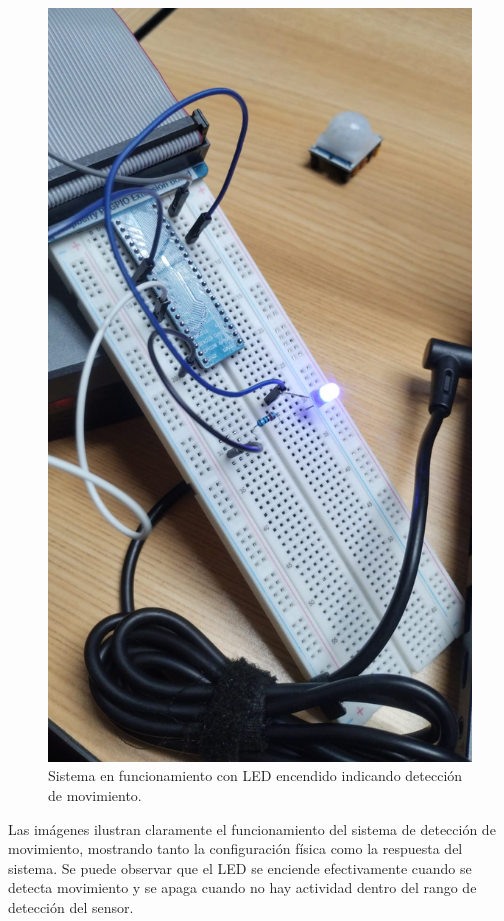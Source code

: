 \begin{figure}[h]
	\centering
	\includegraphics[width=0.5\textheight]{imagenes/4.jpg}
	\caption{Sistema en funcionamiento con LED encendido indicando detección de movimiento.}
	\label{fig:detenccionON}
\end{figure}

Las imágenes ilustran claramente el funcionamiento del sistema de detección de movimiento, mostrando tanto la configuración física como la respuesta del sistema. Se puede observar que el LED se enciende efectivamente cuando se detecta movimiento y se apaga cuando no hay actividad dentro del rango de detección del sensor.